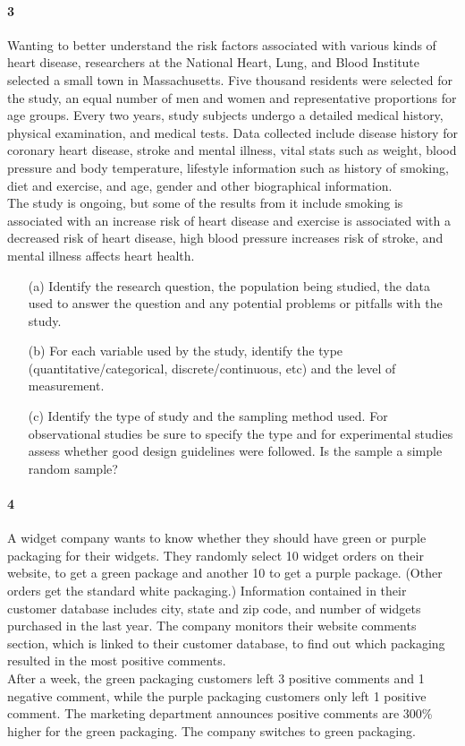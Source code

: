 \documentclass{article}
\begin{document}
\begin{flushleft}
\newpage
\paragraph{3} Wanting to better understand the risk factors associated with various kinds of heart disease, researchers at the National Heart, Lung, and Blood Institute selected a small town in Massachusetts. Five thousand residents were selected for the study, an equal number of men and women and representative proportions for age groups. Every two years, study subjects undergo a detailed medical history, physical examination, and medical tests. Data collected include disease history for coronary heart disease, stroke and mental illness, vital stats such as weight, blood pressure and body temperature, lifestyle information such as history of smoking, diet and exercise, and age, gender and other biographical information.\\
\medskip
The study is ongoing, but some of the results from it include smoking is associated with an increase risk of heart disease and exercise is associated with a decreased risk of heart disease, high blood pressure increases risk of stroke, and mental illness affects heart health.

\begin{itemize}
\item [(a)] Identify the research question, the population being studied, the data used to answer the question and any potential problems or pitfalls with the study.
\vspace{1.5in}
\item[(b)] For each variable used by the study, identify the type (quantitative/categorical, discrete/continuous, etc) and the level of measurement.
\vspace{1.5in}
\item[(c)] Identify the type of study and the sampling method used. For observational studies be sure to specify the type and for experimental studies assess whether good design guidelines were followed. Is the sample a simple random sample?
\end{itemize}

\newpage
\paragraph{4} A widget company wants to know whether they should have green or purple packaging for their widgets. They randomly select 10 widget orders on their website, to get a green package and another 10 to get a purple package. (Other orders get the standard white packaging.) Information contained in their customer database includes city, state and zip code, and number of widgets purchased in the last year. The company monitors their website comments section, which is linked to their customer database, to find out which packaging resulted in the most positive comments.\\
\medskip
After a week, the green packaging customers left 3 positive comments and 1 negative comment, while the purple packaging customers only left 1 positive comment. The marketing department announces positive comments are 300\% higher for the green packaging. The company switches to green packaging.


\end{flushleft}
\end{document}
